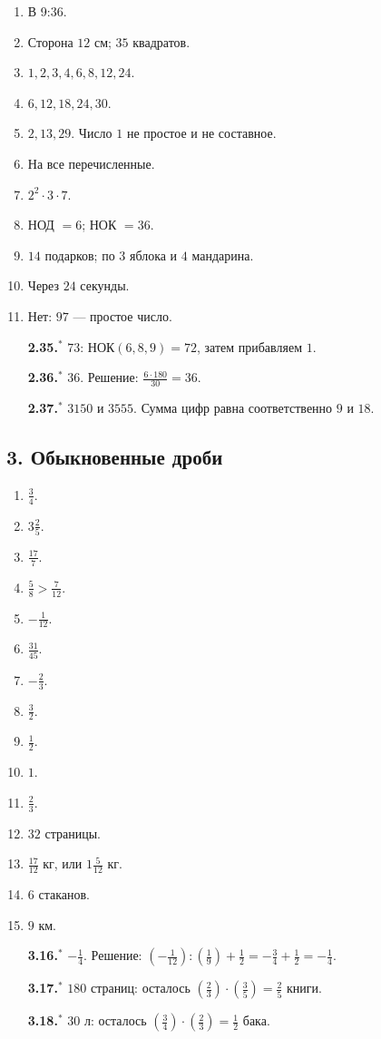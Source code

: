 \documentclass[12pt,a4paper]{article}
\theoremstyle{definition}
\theoremstyle{plain}
\theoremstyle{remark}
\newcommand{\starmark}{\ensuremath{{}^{\ast}}}
\begin{document}
\begin{enumerate}[label=2.\arabic*.,leftmargin=2.8em,itemsep=5pt]
\item В 9:36.
\item Сторона \(12\) см; \(35\) квадратов.
\item \(1,\allowbreak 2,\allowbreak 3,\allowbreak 4,\allowbreak 6,\allowbreak 8,\allowbreak 12,\allowbreak 24\).
\item \(6,\allowbreak 12,\allowbreak 18,\allowbreak 24,\allowbreak 30\).
\item \(2,\allowbreak 13,\allowbreak 29\). Число \(1\) не простое и не составное.
\item На все перечисленные.
\item \(2^{2} \cdot  3 \cdot  7\).
\item НОД \(= 6\); НОК \(= 36\).
\item \(14\) подарков; по \(3\) яблока и \(4\) мандарина.
\item Через \(24\) секунды.
\item Нет: \(97\) — простое число.
\item[\textbf{2.35.}\starmark] \(73\): НОК\((6,8,\allowbreak 9) = 72\), затем прибавляем \(1\).
\item[\textbf{2.36.}\starmark] \(36\). Решение: \(\frac{6 \cdot 180}{30} = 36\).
\item[\textbf{2.37.}\starmark] \(3150\) и \(3555\). Сумма цифр равна соответственно \(9\) и \(18\).
\end{enumerate}
\subsection*{3. Обыкновенные дроби}
\begin{enumerate}[label=3.\arabic*.,leftmargin=2.8em,itemsep=5pt]
\item \(\frac{3}{4}\).
\item \(3 \frac{2}{5}\).
\item \(\frac{17}{7}\).
\item \(\frac{5}{8} > \frac{7}{12}\).
\item \(- \frac{1}{12}\).
\item \(\frac{31}{45}\).
\item \(- \frac{2}{3}\).
\item \(\frac{3}{2}\).
\item \(\frac{1}{2}\).
\item \(1\).
\item \(\frac{2}{3}\).
\item \(32\) страницы.
\item \(\frac{17}{12}\) кг, или \(1 \frac{5}{12}\) кг.
\item \(6\) стаканов.
\item \(9\) км.
\item[\textbf{3.16.}\starmark] \(-\frac{1}{4}\). Решение: \((-\frac{1}{12}) : (\frac{1}{9}) + \frac{1}{2} = -\frac{3}{4} + \frac{1}{2} = -\frac{1}{4}\).
\item[\textbf{3.17.}\starmark] \(180\) страниц: осталось \((\frac{2}{3}) \cdot  (\frac{3}{5}) = \frac{2}{5}\) книги.
\item[\textbf{3.18.}\starmark] \(30\) л: осталось \((\frac{3}{4}) \cdot  (\frac{2}{3}) = \frac{1}{2}\) бака.
\end{enumerate}
\end{document}
